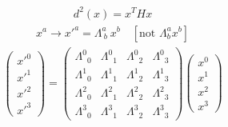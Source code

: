 \documentclass[14pt]{article} %
\begin{document}
\begin{align*}
d^2(x) = x^T H x
\end{align*}
\begin{align*}
x^a \rightarrow x'^a = \Lambda^a_{~b}~x^b \quad [\text{not } \Lambda^a_{b} x^b]
\end{align*}
\begin{align*}
\begin{pmatrix}
x'^0 \\
x'^1 \\
x'^2 \\
x'^3
\end{pmatrix}
=
\begin{pmatrix}
\Lambda^0{}_0 & \Lambda^0{}_1 & \Lambda^0{}_2 & \Lambda^0{}_3 \\
\Lambda^1{}_0 & \Lambda^1{}_1 & \Lambda^1{}_2 & \Lambda^1{}_3 \\
\Lambda^2{}_0 & \Lambda^2{}_1 & \Lambda^2{}_2 & \Lambda^2{}_3 \\
\Lambda^3{}_0 & \Lambda^3{}_1 & \Lambda^3{}_2 & \Lambda^3{}_3
\end{pmatrix}
\begin{pmatrix}
x^0 \\
x^1 \\
x^2 \\
x^3
\end{pmatrix}
\end{align*}
\end{document}
